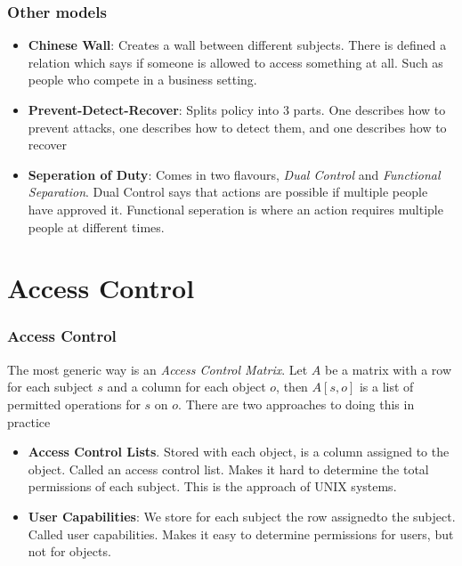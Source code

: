     \begin{frame}
        \frametitle{Other models}
            \begin{itemize}
                \item \textbf{Chinese Wall}: Creates a wall between different subjects. There is defined a relation which says if someone is allowed to access something at all. Such as people who compete in a business setting. 
                \item \textbf{Prevent-Detect-Recover}: Splits policy into 3 parts. One describes how to prevent attacks, one describes how to detect them, and one describes how to recover
                \item \textbf{Seperation of Duty}: Comes in two flavours, \textit{Dual Control} and \textit{Functional Separation}. Dual Control says that actions are possible if multiple people have approved it. Functional seperation is where an action requires multiple people at different times. 
            \end{itemize}
    \end{frame}

\section{Access Control}
        \begin{frame}
            \frametitle{Access Control}
                The most generic way is an \textit{Access Control Matrix}. Let $A$ be a matrix with a row for each subject $s$ and a column for each object $o$, then $A[s, o]$ is a list of permitted operations for $s$ on $o$. 
                There are two approaches to doing this in practice
                \begin{itemize}
                    \item \textbf{Access Control Lists}. Stored with each object, is a column assigned to the object. Called an access control list. Makes it hard to determine the total permissions of each subject. This is the approach of UNIX systems. 
                    \item \textbf{User Capabilities}: We store for each subject the row assignedto the subject. Called user capabilities. Makes it easy to determine permissions for users, but not for objects. 
                \end{itemize}
        \end{frame}

